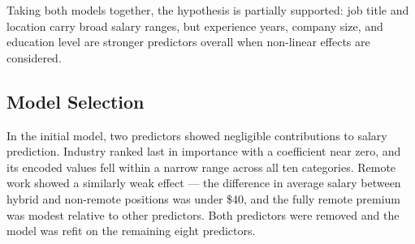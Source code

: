 \documentclass[
]{article}
\begin{document}
Taking both models together, the hypothesis is partially supported: job
title and location carry broad salary ranges, but experience years,
company size, and education level are stronger predictors overall when
non-linear effects are considered.

\subsection{Model Selection}\label{model-selection}

In the initial model, two predictors showed negligible contributions to
salary prediction. Industry ranked last in importance with a coefficient
near zero, and its encoded values fell within a narrow range across all
ten categories. Remote work showed a similarly weak effect --- the
difference in average salary between hybrid and non-remote positions was
under \$40, and the fully remote premium was modest relative to other
predictors. Both predictors were removed and the model was refit on the
remaining eight predictors.
\end{document}
